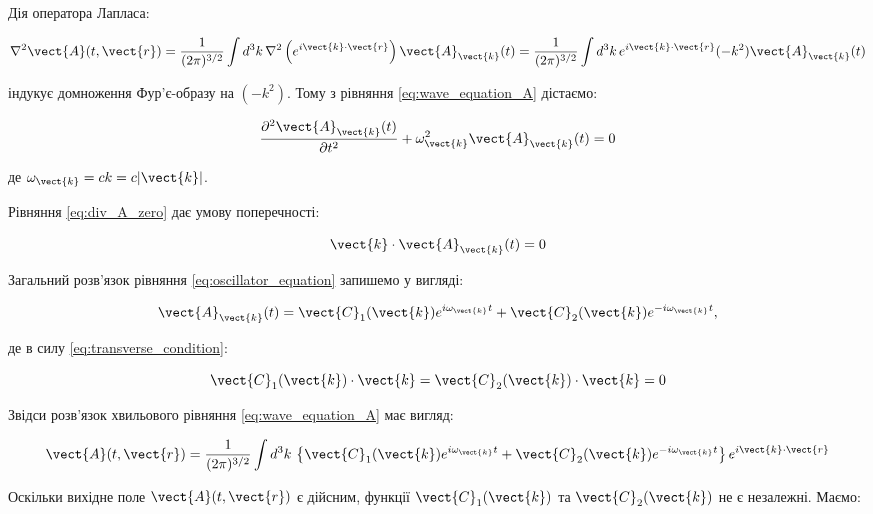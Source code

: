 Дія оператора Лапласа:

\begin{equation*}
\nabla^2 \vect{A}(t, \vect{r}) = \frac{1}{(2\pi)^{3/2}} \int d^3k \, \nabla^2 \left( e^{i\vect{k} \cdot \vect{r}} \right) \vect{A}_{\vect{k}}(t) =
\frac{1}{(2\pi)^{3/2}} \int d^3k \, e^{i\vect{k} \cdot \vect{r}} (-k^2) \vect{A}_{\vect{k}}(t)
\end{equation*}

індукує домноження Фур’є-образу на \((-k^2)\). Тому з рівняння \eqref{eq:wave_equation_A} дістаємо:

\begin{equation}
\frac{\partial^2 \vect{A}_{\vect{k}}(t)}{\partial t^2} + \omega_{\vect{k}}^2 \vect{A}_{\vect{k}}(t) = 0
\label{eq:oscillator_equation}
\end{equation}

де \(\omega_{\vect{k}} = ck = c|\vect{k}|\).

Рівняння \eqref{eq:div_A_zero} дає умову поперечності:

\begin{equation}
\vect{k} \cdot \vect{A}_{\vect{k}}(t) = 0
\label{eq:transverse_condition}
\end{equation}

Загальний розв’язок рівняння \eqref{eq:oscillator_equation} запишемо у вигляді:

\begin{equation}
\vect{A}_{\vect{k}}(t) = \vect{C}_1(\vect{k}) e^{i\omega_{\vect{k}} t} + \vect{C}_2(\vect{k}) e^{-i\omega_{\vect{k}} t},
\label{eq:general_solution_Ak}
\end{equation}

де в силу \eqref{eq:transverse_condition}:

\begin{equation*}
\vect{C}_1(\vect{k}) \cdot \vect{k} = \vect{C}_2(\vect{k}) \cdot \vect{k} = 0
\end{equation*}

Звідси розв’язок хвильового рівняння \eqref{eq:wave_equation_A} має вигляд:

\begin{equation}
\vect{A}(t, \vect{r}) = \frac{1}{(2\pi)^{3/2}} \int d^3k \, \left\{ \vect{C}_1(\vect{k}) e^{i\omega_{\vect{k}} t} + \vect{C}_2(\vect{k})
e^{-i\omega_{\vect{k}} t} \right\} e^{i\vect{k} \cdot \vect{r}}
\label{eq:general_solution_A}
\end{equation}

Оскільки вихідне поле \(\vect{A}(t, \vect{r})\) є дійсним, функції \(\vect{C}_1(\vect{k})\) та \(\vect{C}_2(\vect{k})\) не є незалежні. Маємо:

